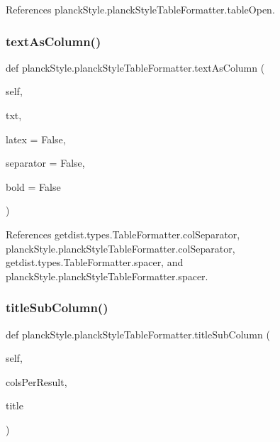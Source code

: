 References planck\+Style.\+planck\+Style\+Table\+Formatter.\+table\+Open.

\mbox{\label{classplanckStyle_1_1planckStyleTableFormatter_a08c8e8a7d93e15be39a9b26ff6cab416}} 
\subsubsection{\texorpdfstring{text\+As\+Column()}{textAsColumn()}}
{\footnotesize\ttfamily def planck\+Style.\+planck\+Style\+Table\+Formatter.\+text\+As\+Column (\begin{DoxyParamCaption}\item[{}]{self,  }\item[{}]{txt,  }\item[{}]{latex = {\ttfamily False},  }\item[{}]{separator = {\ttfamily False},  }\item[{}]{bold = {\ttfamily False} }\end{DoxyParamCaption})}



References getdist.\+types.\+Table\+Formatter.\+col\+Separator, planck\+Style.\+planck\+Style\+Table\+Formatter.\+col\+Separator, getdist.\+types.\+Table\+Formatter.\+spacer, and planck\+Style.\+planck\+Style\+Table\+Formatter.\+spacer.

\mbox{\label{classplanckStyle_1_1planckStyleTableFormatter_a5404c2d4f5b0143c48eb8922739b9769}} 
\subsubsection{\texorpdfstring{title\+Sub\+Column()}{titleSubColumn()}}
{\footnotesize\ttfamily def planck\+Style.\+planck\+Style\+Table\+Formatter.\+title\+Sub\+Column (\begin{DoxyParamCaption}\item[{}]{self,  }\item[{}]{cols\+Per\+Result,  }\item[{}]{title }\end{DoxyParamCaption})}



